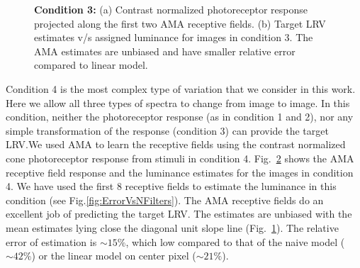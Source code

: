 \documentclass{jov}
\begin{document}
\begin{figure}
\begin{subfigure}[b]{0.3 \textwidth}
        \label{fig:case12Results}
    \end{subfigure}
    \caption{{\bf Condition 3:} (a) Contrast normalized photoreceptor response projected along the first two AMA receptive fields. (b) Target LRV estimates v/s assigned luminance for images in condition 3. The AMA estimates are unbiased and have smaller relative error compared to linear model.}
    \label{fig:case12AllResults}
\end{figure}

Condition 4 is the most complex type of variation that we consider in this work. Here we allow all three types of spectra to change from image to image. In this condition, neither the photoreceptor response (as in condition 1 and 2), nor any simple transformation of the response (condition 3) can provide the target LRV.We used AMA to learn the receptive fields using the contrast normalized cone photoreceptor response from stimuli in condition 4. Fig.~\ref{fig:case12AllResults} shows the AMA receptive field response and the luminance estimates for the images in condition 4. 
We have used the first 8 receptive fields to estimate the luminance in this condition (see Fig.\ref{fig:ErrorVsNFilters}). 
The AMA receptive fields do an excellent job of predicting the target LRV. 
The estimates are unbiased with the mean estimates lying close the diagonal unit slope line (Fig.~\ref{fig:case12Results}). 
The relative error of estimation is $\sim15\%$, which low compared to that of the naive model ($\sim42\%$) or the linear model on center pixel ($\sim21\%$).
\end{document}
